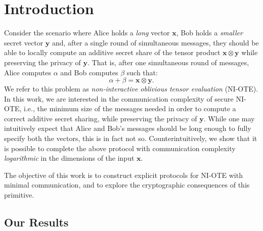 \documentclass{article}
\begin{document}
 


\section{Introduction}


Consider the scenario where Alice holds a \emph{long} vector $\mathbf{x}$, Bob holds a \emph{smaller} secret vector $\mathbf{y}$ and, after a single round of simultaneous messages, they should be able to locally compute an additive secret share of the tensor product $\mathbf{x} \otimes \mathbf{y}$ while preserving the privacy of $\mathbf{y}$. That is, after one simultaneous round of messages, Alice computes $\alpha$ and Bob computes $\beta$ such that:
\[
\alpha + \beta = \mathbf{x}\otimes \mathbf{y}.
\]
We refer to this problem as \emph{non-interactive oblivious tensor evaluation} (NI-OTE). In this work, we are interested in the communication complexity of secure NI-OTE, i.e., the minimum size of the messages needed in order to compute a correct additive secret sharing, while preserving the privacy of $\mathbf{y}$. While one may intuitively expect that Alice and Bob's messages should be long enough to fully specify both the vectors, this is in fact not so. Counterintuitively, we show that it is possible to complete the above protocol with communication complexity \emph{logarithmic} in the dimensions of the input $\mathbf{x}$.

The objective of this work is to construct explicit protocols for NI-OTE with minimal communication, and to explore the cryptographic consequences of this primitive.

\subsection{Our Results}
\end{document}
